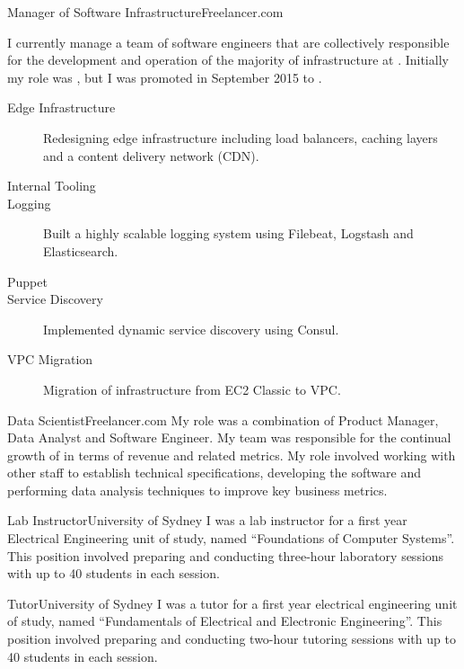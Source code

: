 \begin{professionalExperience}

{Manager of Software Infrastructure}{Freelancer.com}
{
  I currently manage a team of software engineers that are collectively
  responsible for the development and operation of the majority of
  infrastructure at . Initially my role was
  , but I was promoted in September
  2015 to .

  \begin{description}
    \item[Edge Infrastructure] Redesigning edge infrastructure including load
      balancers, caching layers and a content delivery network (CDN).
    \item[Internal Tooling]
    \item[Logging] Built a highly scalable logging system using Filebeat,
      Logstash and Elasticsearch.
    \item[Puppet]
    \item[Service Discovery] Implemented dynamic service discovery using Consul.
    \item[VPC Migration] Migration of infrastructure from EC2 Classic to VPC.
  \end{description}
}

{Data Scientist}{Freelancer.com}
{My role was a combination of Product Manager, Data Analyst and Software
Engineer. My team was responsible for the continual growth of
 in terms of revenue and related metrics. My role
involved working with other staff to establish technical specifications,
developing the software and performing data analysis techniques to improve key
business metrics.}

{Lab Instructor}{University of Sydney}
{I was a lab instructor for a first year Electrical Engineering unit of study,
named ``Foundations of Computer Systems''. This position involved preparing
and conducting three-hour laboratory sessions with up to 40 students in each
session.}

{Tutor}{University of Sydney}
{I was a tutor for a first year electrical engineering unit of study, named
``Fundamentals of Electrical and Electronic Engineering''. This position
involved preparing and conducting two-hour tutoring sessions with up to 40
students in each session.}

\end{professionalExperience}
